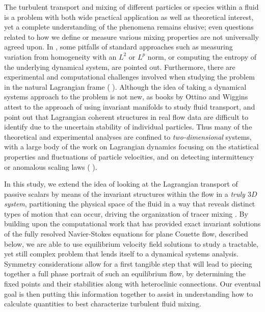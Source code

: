 \documentclass[letter,12pt,openany]{article}
\begin{document}
The turbulent transport and mixing of different particles or species within a fluid is a problem with both wide practical application as well as theoretical interest, yet a complete understanding of the phenomena remains elusive; even questions related to how we define or measure various mixing properties are not universally agreed upon. In \cite{Mathew}, some pitfalls of standard approaches such as measuring variation from homogeneity with an $L^2$ or $L^p$ norm, or computing the entropy of the underlying dynamical system, are pointed out. Furthermore, there are experimental and computational challenges involved when studying the problem in the natural Lagrangian frame (\cite{MHPRS07} \cite{ABBBBB08} \cite{Braun1} \cite{Mordant}). Although the idea of taking a dynamical systems approach to the problem is not new, as books by Ottino \cite{Botti89} and Wiggins \cite{wiggbook} attest to the approach of using invariant manifolds to study fluid transport, \cite{MHPRS07} and \cite{HallerLagrangian} point out that Lagrangian coherent structures in real flow data are difficult to identify due to the uncertain stability of individual particles. Thus many of the theoretical and experimental analyses are confined to \textit{two-dimensional} systems, with a large body of the work on Lagrangian dynamics focusing on the statistical properties and fluctuations of particle velocities, and on detecting intermittency or anomalous scaling laws (\cite{Nzerem} \cite{Mordant} \cite{ABBBBB08} \cite{Falkovich}).

In this study, we extend the idea of looking at the Lagrangian transport of passive scalars by means of the invariant structures within the flow in a \textit{truly $3D$ system}, partitioning the physical space of the fluid in a way that reveals distinct types of motion that can occur, driving the organization of tracer mixing \cite{HallerLagrangian}. By building upon the computational work that has provided exact invariant solutions of the fully resolved Navier-Stokes equations for plane Couette flow, described below, we are able to use equilibrium velocity field solutions to study a tractable, yet still complex problem that lends itself to a dynamical systems analysis. Symmetry considerations allow for a first tangible step that will lead to piecing together a full phase portrait of such an equilibrium flow, by determining the fixed points and their stabilities along with heteroclinic connections.  Our eventual goal is then putting this information
together to assist in understanding how to calculate quantities to best characterize turbulent fluid mixing.
\end{document}

